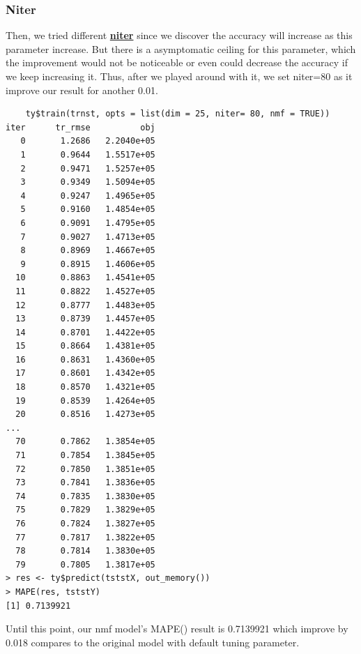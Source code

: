 \documentclass[11pt]{article}
\newcommand\tab[1][0.5cm]{\hspace*{#1}}
\begin{document}
\subsubsection{Niter}
\tab{}Then, we tried different \textbf{\underline{niter}} since we discover the accuracy will increase as this parameter increase. But there is a asymptomatic ceiling for this parameter, which the improvement would not be noticeable or even could decrease the accuracy if we keep increasing it. Thus, after we played around with it, we set niter=80 as it improve our result for another 0.01.
\begin{verbatim}
    ty$train(trnst, opts = list(dim = 25, niter= 80, nmf = TRUE))
iter      tr_rmse          obj
   0       1.2686   2.2040e+05
   1       0.9644   1.5517e+05
   2       0.9471   1.5257e+05
   3       0.9349   1.5094e+05
   4       0.9247   1.4965e+05
   5       0.9160   1.4854e+05
   6       0.9091   1.4795e+05
   7       0.9027   1.4713e+05
   8       0.8969   1.4667e+05
   9       0.8915   1.4606e+05
  10       0.8863   1.4541e+05
  11       0.8822   1.4527e+05
  12       0.8777   1.4483e+05
  13       0.8739   1.4457e+05
  14       0.8701   1.4422e+05
  15       0.8664   1.4381e+05
  16       0.8631   1.4360e+05
  17       0.8601   1.4342e+05
  18       0.8570   1.4321e+05
  19       0.8539   1.4264e+05
  20       0.8516   1.4273e+05
...
  70       0.7862   1.3854e+05
  71       0.7854   1.3845e+05
  72       0.7850   1.3851e+05
  73       0.7841   1.3836e+05
  74       0.7835   1.3830e+05
  75       0.7829   1.3829e+05
  76       0.7824   1.3827e+05
  77       0.7817   1.3822e+05
  78       0.7814   1.3830e+05
  79       0.7805   1.3817e+05
> res <- ty$predict(tststX, out_memory())
> MAPE(res, tststY)
[1] 0.7139921
\end{verbatim}
\tab{}Until this point, our nmf model's MAPE() result is 0.7139921 which improve by 0.018 compares to the original model with default tuning parameter. 
\end{document}
